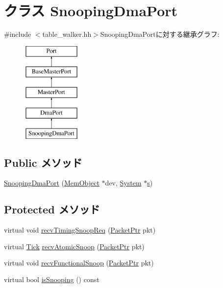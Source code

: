 \hypertarget{classArmISA_1_1TableWalker_1_1SnoopingDmaPort}{
\section{クラス SnoopingDmaPort}
\label{classArmISA_1_1TableWalker_1_1SnoopingDmaPort}
}


{\ttfamily \#include $<$table\_\-walker.hh$>$}SnoopingDmaPortに対する継承グラフ:\begin{figure}[H]
\begin{center}
\leavevmode
\includegraphics[height=5cm]{classArmISA_1_1TableWalker_1_1SnoopingDmaPort}
\end{center}
\end{figure}
\subsection*{Public メソッド}
\begin{DoxyCompactItemize}
\item 
\hyperlink{classArmISA_1_1TableWalker_1_1SnoopingDmaPort_aedb9236e2002a256faa055089d764d32}{SnoopingDmaPort} (\hyperlink{classMemObject_1_1MemObject}{MemObject} $\ast$dev, \hyperlink{classSystem}{System} $\ast$\hyperlink{namespaceArmISA_afaeb18e17f862d8fcb76dfb68a18854f}{s})
\end{DoxyCompactItemize}
\subsection*{Protected メソッド}
\begin{DoxyCompactItemize}
\item 
virtual void \hyperlink{classArmISA_1_1TableWalker_1_1SnoopingDmaPort_ae43c73eff109f907118829fcfa9e7096}{recvTimingSnoopReq} (\hyperlink{classPacket}{PacketPtr} pkt)
\item 
virtual \hyperlink{classm5_1_1params_1_1Tick}{Tick} \hyperlink{classArmISA_1_1TableWalker_1_1SnoopingDmaPort_ae1160d8f94f042aba1dc9a07a72e1e82}{recvAtomicSnoop} (\hyperlink{classPacket}{PacketPtr} pkt)
\item 
virtual void \hyperlink{classArmISA_1_1TableWalker_1_1SnoopingDmaPort_af5b15bc08781cf0ba6190efc37d5b67e}{recvFunctionalSnoop} (\hyperlink{classPacket}{PacketPtr} pkt)
\item 
virtual bool \hyperlink{classArmISA_1_1TableWalker_1_1SnoopingDmaPort_a32602a6a3c3d66a639455036d6c08dd6}{isSnooping} () const 
\end{DoxyCompactItemize}


